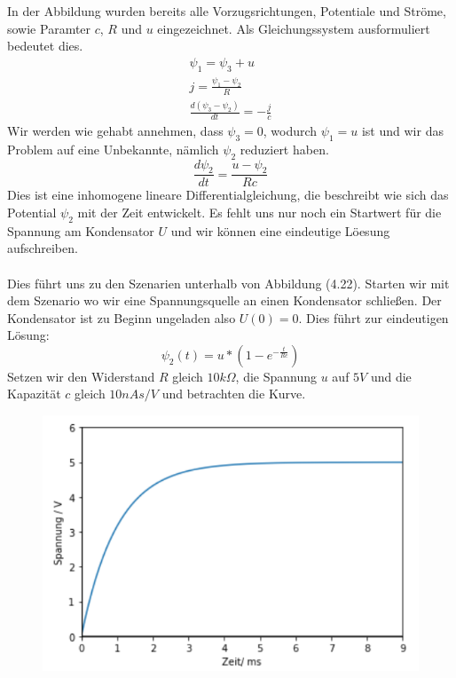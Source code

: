 \documentclass[11pt,a4paper,leqno]{report}
\numberwithin{equation}{chapter}
\begin{document}
 \noindent
 In der Abbildung wurden bereits alle Vorzugsrichtungen, Potentiale und Str\"ome, sowie Paramter $c$, $R$ und $u$ eingezeichnet. Als Gleichungssystem ausformuliert bedeutet dies.
 \begin{align} 
 	\psi_1 = \psi_3 + u\\
	j = \frac{\psi_1 - \psi_2}{R}\\
	\frac{d(\psi_3 - \psi_2)}{dt} = - \frac{j}{c}
 \end{align}
Wir werden wie gehabt annehmen, dass $\psi_3 = 0$, wodurch $\psi_1 = u$ ist und wir das Problem auf eine Unbekannte, n\"amlich $\psi_2$ reduziert haben.
\begin{equation}
	\frac{d\psi_2}{dt} = \frac{u - \psi_2}{R c}
\end{equation}
Dies ist eine inhomogene lineare Differentialgleichung, die beschreibt wie sich das Potential $\psi_2$ mit der Zeit entwickelt. Es fehlt uns nur noch ein Startwert f\"ur die Spannung am Kondensator $U$ und wir k\"onnen eine eindeutige L\"oesung aufschreiben. \\
\\
Dies f\"uhrt uns zu den Szenarien unterhalb von Abbildung (4.22). Starten wir mit dem Szenario wo wir eine Spannungsquelle an einen Kondensator schlie\ss{}en. Der Kondensator ist zu Beginn ungeladen also $U(0) = 0$.
Dies f\"uhrt zur eindeutigen L\"osung:
\begin{equation}
	\psi_2(t) = u * (1 - e^{-\frac{t}{Rc}})
\end{equation}
Setzen wir den Widerstand $R$ gleich $10k\Omega$, die Spannung $u$ auf $5V$ und die Kapazit\"at $c$ gleich $10nAs/V$ und betrachten die Kurve.
   \begin{figure}[H]
	\begin{center}
		\includegraphics[scale=0.5]{Bilder/Ladung.png}
	\end{center}
\end{figure}
\end{document}
